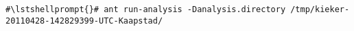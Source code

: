 \begin{lstlisting}[caption=Command to compile and run the instrumented Bookstore via ant]
#\lstshellprompt{}# ant run-analysis -Danalysis.directory /tmp/kieker-20110428-142829399-UTC-Kaapstad/
\end{lstlisting}%
